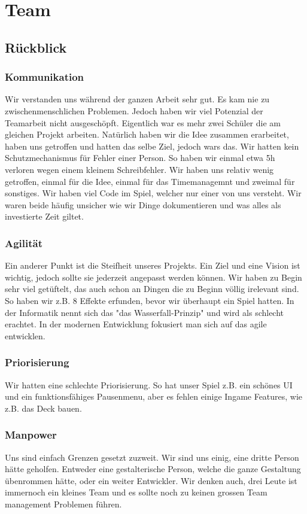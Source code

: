 \chapter{Team}

\section{Rückblick}

\subsection*{Kommunikation}
Wir verstanden uns während der ganzen Arbeit sehr gut.
Es kam nie zu zwischenmenschlichen Problemen. Jedoch haben wir viel Potenzial der Teamarbeit nicht ausgeschöpft.
Eigentlich war es mehr zwei Schüler die am gleichen Projekt arbeiten.
Natürlich haben wir die Idee zusammen erarbeitet, haben uns getroffen und hatten das selbe Ziel, jedoch wars das.
Wir hatten kein Schutzmechanismus für Fehler einer Person.
So haben wir einmal etwa 5h verloren wegen einem kleinem Schreibfehler.
Wir haben uns relativ wenig getroffen, einmal für die Idee, einmal für das Timemanagemnt und zweimal für sonstiges.
Wir haben viel Code im Spiel, welcher nur einer von uns versteht.
Wir waren beide häufig unsicher wie wir Dinge dokumentieren und was alles als investierte Zeit giltet.

\subsection*{Agilität}
Ein anderer Punkt ist die Steifheit unseres Projekts.
Ein Ziel und eine Vision ist wichtig, jedoch sollte sie jederzeit angepasst werden können.
Wir haben zu Begin sehr viel getüftelt, das auch schon an Dingen die zu Beginn völlig irelevant sind.
So haben wir z.B. 8 Effekte erfunden, bevor wir überhaupt ein Spiel hatten.
In der Informatik nennt sich das "das Wasserfall-Prinzip" und wird als schlecht erachtet.
In der modernen Entwicklung fokusiert man sich auf das agile entwicklen.

\subsection*{Priorisierung}
Wir hatten eine schlechte Priorisierung.
So hat unser Spiel z.B. ein schönes UI und ein funktionsfähiges Pausenmenu, aber es fehlen einige Ingame Features, wie z.B. das Deck bauen.

\subsection*{Manpower}
Uns sind einfach Grenzen gesetzt zuzweit.
Wir sind uns einig, eine dritte Person hätte geholfen.
Entweder eine gestalterische Person, welche die ganze Gestaltung übenrommen hätte, oder ein weiter Entwickler.
Wir denken auch, drei Leute ist immernoch ein kleines Team und es sollte noch zu keinen grossen Team management Problemen führen.

